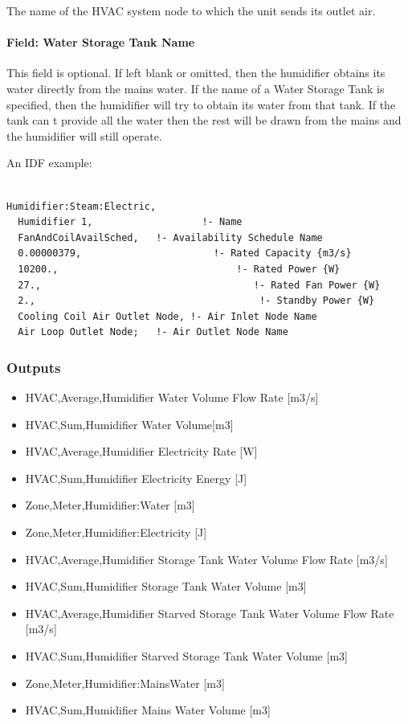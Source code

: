 The name of the HVAC system node to which the unit sends its outlet air.

\paragraph{Field: Water Storage Tank Name}\label{field-water-storage-tank-name}

This field is optional. If left blank or omitted, then the humidifier obtains its water directly from the mains water. If the name of a Water Storage Tank is specified, then the humidifier will try to obtain its water from that tank. If the tank can t provide all the water then the rest will be drawn from the mains and the humidifier will still operate.

An IDF example:

\begin{lstlisting}

Humidifier:Steam:Electric,
  Humidifier 1,                   !- Name
  FanAndCoilAvailSched,   !- Availability Schedule Name
  0.00000379,                       !- Rated Capacity {m3/s}
  10200.,                               !- Rated Power {W}
  27.,                                     !- Rated Fan Power {W}
  2.,                                       !- Standby Power {W}
  Cooling Coil Air Outlet Node, !- Air Inlet Node Name
  Air Loop Outlet Node;   !- Air Outlet Node Name
\end{lstlisting}

\subsubsection{Outputs}\label{outputs-016}

\begin{itemize}
\item
  HVAC,Average,Humidifier Water Volume Flow Rate {[}m3/s{]}
\item
  HVAC,Sum,Humidifier Water Volume{[}m3{]}
\item
  HVAC,Average,Humidifier Electricity Rate {[}W{]}
\item
  HVAC,Sum,Humidifier Electricity Energy {[}J{]}
\item
  Zone,Meter,Humidifier:Water {[}m3{]}
\item
  Zone,Meter,Humidifier:Electricity {[}J{]}
\item
  HVAC,Average,Humidifier Storage Tank Water Volume Flow Rate {[}m3/s{]}
\item
  HVAC,Sum,Humidifier Storage Tank Water Volume {[}m3{]}
\item
  HVAC,Average,Humidifier Starved Storage Tank Water Volume Flow Rate {[}m3/s{]}
\item
  HVAC,Sum,Humidifier Starved Storage Tank Water Volume {[}m3{]}
\item
  Zone,Meter,Humidifier:MainsWater {[}m3{]}
\item
  HVAC,Sum,Humidifier Mains Water Volume {[}m3{]}
\end{itemize}

